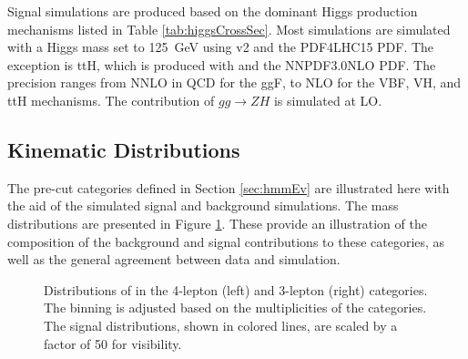 Signal simulations are produced based on the dominant Higgs production mechanisms listed in Table \ref{tab:higgsCrossSec}.
Most simulations are simulated with a Higgs mass set to 125~GeV using \powheg v2 and the PDF4LHC15 PDF. 
The exception is ttH, which is produced with \madgraph and the NNPDF3.0NLO PDF.
The precision ranges from NNLO in QCD for the ggF, to NLO for the VBF, VH, and ttH mechanisms.
The contribution of $gg\to ZH$ is simulated at LO.


\subsection{Kinematic Distributions}\label{sec:hmmKine}

The pre-cut categories defined in Section \ref{sec:hmmEv} are illustrated here with the aid of the simulated signal and background simulations.
The mass distributions are presented in Figure \ref{fig:hmmPrecutMassHists}.
These provide an illustration of the composition of the background and signal contributions to these categories, as well as the general agreement between data and simulation. 

\begin{figure}[h!]
\captionsetup[subfigure]{position=b}
\centering
{}
\caption{Distributions of \muu in the 4-lepton (left) and 3-lepton (right) categories. The binning is adjusted based on the multiplicities of the categories. The signal distributions, shown in colored lines, are scaled by a factor of 50 for visibility.}
\label{fig:hmmPrecutMassHists}
\end{figure}

